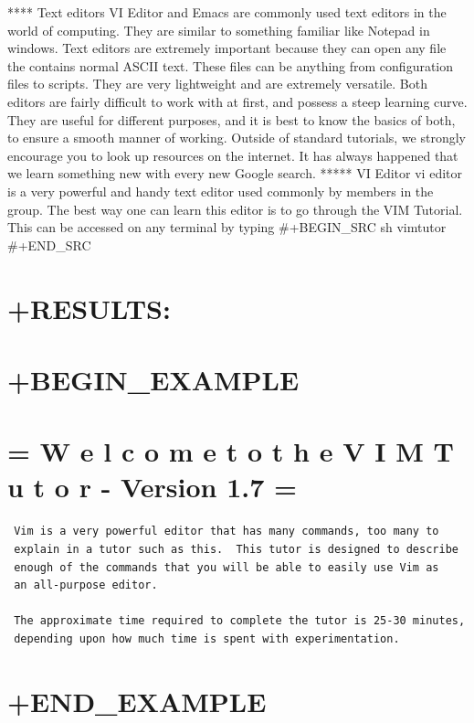 \documentclass[11pt]{article}
\begin{document}
**** Text editors VI Editor and Emacs are commonly used text editors in
the world of computing. They are similar to something familiar like
Notepad in windows. Text editors are extremely important because they
can open any file the contains normal ASCII text. These files can be
anything from configuration files to scripts. They are very lightweight
and are extremely versatile. Both editors are fairly difficult to work
with at first, and possess a steep learning curve. They are useful for
different purposes, and it is best to know the basics of both, to ensure
a smooth manner of working. Outside of standard tutorials, we strongly
encourage you to look up resources on the internet. It has always
happened that we learn something new with every new Google search. *****
VI Editor vi editor is a very powerful and handy text editor used
commonly by members in the group. The best way one can learn this editor
is to go through the VIM Tutorial. This can be accessed on any terminal
by typing \#+BEGIN\_SRC sh vimtutor \#+END\_SRC

\section{+RESULTS:}\label{results-4}

\section{+BEGIN\_EXAMPLE}\label{begin_example-2}

\section{= W e l c o m e t o t h e V I M T u t o r - Version 1.7
=}\label{w-e-l-c-o-m-e-t-o-t-h-e-v-i-m-t-u-t-o-r---version-1.7}

\begin{verbatim}
 Vim is a very powerful editor that has many commands, too many to
 explain in a tutor such as this.  This tutor is designed to describe
 enough of the commands that you will be able to easily use Vim as
 an all-purpose editor.

 The approximate time required to complete the tutor is 25-30 minutes,
 depending upon how much time is spent with experimentation.
\end{verbatim}

\section{+END\_EXAMPLE}\label{end_example}
\end{document}
